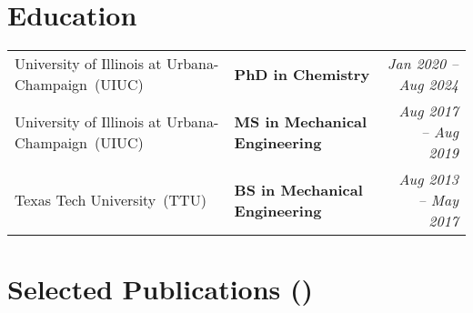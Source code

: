 \documentclass[letterpaper,10pt]{article}
\makeatletter
\newcommand{\sectionspace}{
\vspace{-17pt}
}
\newcommand{\subheadingtitlevspace}{
\vspace{-3pt}
}
\newcommand{\titleItem}[1]{
  \textbf{#1}
}
\newcommand{\resumeSubheading}[4]{
  \item
     \begin{tabular*}{0.97\textwidth}[t]{l@{\extracolsep{\fill}}l@{}l}     
      {#1} & \titleItem{#3} | {#2} & \textit{#4}\\
    \end{tabular*}\vspace{-10pt}
}
\newcommand{\resumeSubHeadingListStart}{\subheadingtitlevspace\begin{itemize}[leftmargin=0.15in, label={}]}
\newcommand{\resumeSubHeadingListEnd}{\end{itemize}}
\makeatother
\begin{document}
\section{\textcolor{color1}{Education}}

\vspace{-3pt}
{
  \setlength\tabcolsep{0pt}
  \begin{tabular*}{\linewidth}{@{\extracolsep{\fill}} llr}
    University of Illinois at Urbana-Champaign~(UIUC) & \textbf{PhD in Chemistry} & \textcolor{color2}{\textit{Jan 2020 -- Aug 2024}}\\
    University of Illinois at Urbana-Champaign~(UIUC) & \textbf{MS in Mechanical Engineering} & \textcolor{color2}{\textit{Aug 2017 -- Aug 2019}}\\
    Texas Tech University~(TTU) & \textbf{BS in Mechanical Engineering} & \textcolor{color2}{\textit{Aug 2013 -- May 2017}}\\
  \end{tabular*}
}
\sectionspace
\vspace{3pt}


\section{\textcolor{color1}{Selected Publications {\normalsize (})}}
\end{document}
